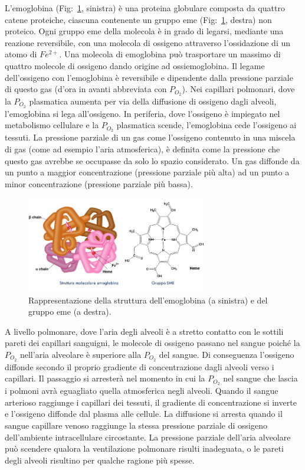 \documentclass[a4paper, 12pt]{book}
\begin{document}
L'emoglobina (Fig:~\ref{fig:Structure}, sinistra) è una proteina globulare composta da quattro catene proteiche, ciascuna contenente un gruppo eme (Fig:~\ref{fig:Structure}, destra) non proteico.
Ogni gruppo eme della molecola è in grado di legarsi, mediante una reazione reversibile, con una molecola di ossigeno attraverso l’ossidazione di un atomo di $Fe^{2+}$.
Una molecola di emoglobina può trasportare un massimo di quattro molecole di ossigeno dando origine ad ossiemoglobina.
Il legame dell'ossigeno con l'emoglobina è reversibile e dipendente dalla pressione parziale di questo gas (d'ora in avanti abbreviata con $P_{O_2}$).
Nei capillari polmonari, dove la $P_{O_2}$ plasmatica aumenta per via della diffusione di ossigeno dagli alveoli, l'emoglobina si lega all'ossigeno.
In periferia, dove l'ossigeno è impiegato nel metabolismo cellulare e la $P_{O_2}$ plasmatica scende, l'emoglobina cede l'ossigeno ai tessuti.
La pressione parziale di un gas come l'ossigeno contenuto in una miscela di gas (come ad esempio l'aria atmosferica), è definita come la pressione che questo gas avrebbe se occupasse da solo lo spazio considerato.
Un gas diffonde da un punto a maggior concentrazione (pressione parziale più alta) ad un punto a minor concentrazione (pressione parziale più bassa).
\begin{figure}[h!]
    \centering
    \includegraphics[width=0.7\textwidth]{emoglobina-struttura.jpeg}
    \caption{Rappresentazione della struttura dell'emoglobina (a sinistra) e del gruppo 			 eme (a destra).}
    \label{fig:Structure}
\end{figure}
A livello polmonare, dove l'aria degli alveoli è a stretto contatto con le sottili pareti dei capillari sanguigni, le molecole di ossigeno passano nel sangue poiché la $P_{O_2}$ nell'aria alveolare è superiore alla $P_{O_2}$ del sangue.
Di conseguenza l'ossigeno diffonde secondo il proprio gradiente di concentrazione dagli alveoli verso i capillari.
Il passaggio si arresterà nel momento in cui la $P_{O_2}$ nel sangue che lascia i polmoni avrà eguagliato quella atmosferica negli alveoli.
Quando il sangue arterioso raggiunge i capillari dei tessuti, il gradiente di concentrazione si inverte e l'ossigeno diffonde dal plasma alle cellule.
La diffusione si arresta quando il sangue capillare venoso raggiunge la stessa pressione parziale di ossigeno dell'ambiente intracellulare circostante.
La pressione parziale dell'aria alveolare può scendere qualora la ventilazione polmonare risulti inadeguata, o le pareti degli alveoli risultino per qualche ragione più spesse.
\end{document}
